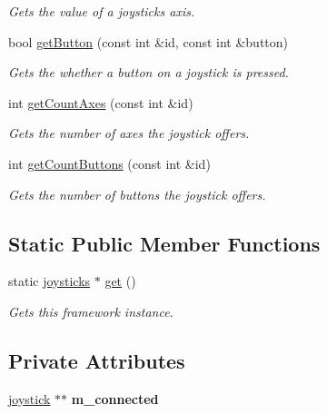 \begin{DoxyCompactItemize}
\begin{DoxyCompactList}\small\item\em Gets the value of a joysticks axis. \end{DoxyCompactList}\item 
bool \hyperlink{classflounder_1_1joysticks_a908373adb0a8ca4818b7d49b273d4622}{get\+Button} (const int \&id, const int \&button)
\begin{DoxyCompactList}\small\item\em Gets the whether a button on a joystick is pressed. \end{DoxyCompactList}\item 
int \hyperlink{classflounder_1_1joysticks_abe58d868cb70e9d7f2a10eb0f1b967e1}{get\+Count\+Axes} (const int \&id)
\begin{DoxyCompactList}\small\item\em Gets the number of axes the joystick offers. \end{DoxyCompactList}\item 
int \hyperlink{classflounder_1_1joysticks_af502daffac227f63e673ed3f45850380}{get\+Count\+Buttons} (const int \&id)
\begin{DoxyCompactList}\small\item\em Gets the number of buttons the joystick offers. \end{DoxyCompactList}\end{DoxyCompactItemize}
\subsection*{Static Public Member Functions}
\begin{DoxyCompactItemize}
\item 
static \hyperlink{classflounder_1_1joysticks}{joysticks} $\ast$ \hyperlink{classflounder_1_1joysticks_a2c47c69053bf582ee6eb22d135d71084}{get} ()
\begin{DoxyCompactList}\small\item\em Gets this framework instance. \end{DoxyCompactList}\end{DoxyCompactItemize}
\subsection*{Private Attributes}
\begin{DoxyCompactItemize}
\item 
\mbox{\label{classflounder_1_1joysticks_a9000954268ff0dc151b34904514e2942}} 
\hyperlink{structflounder_1_1joysticks_1_1joystick}{joystick} $\ast$$\ast$ {\bfseries m\+\_\+connected}
\end{DoxyCompactItemize}


